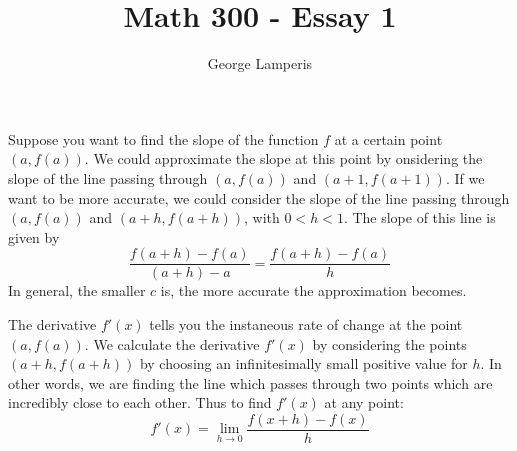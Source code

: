 \documentclass[12pt]{article}
\title{Math 300 - Essay 1}
\author{George Lamperis}
\date{}
\begin{document}
\maketitle

Suppose you want to find the slope of the function $f$ at a certain
point $(a, f(a))$. We could approximate the slope at this point by onsidering
the slope of the line passing through $(a, f(a))$ and $(a+1, f(a+1))$. If we 
want to be more accurate, we could consider the slope of the line passing 
through $(a, f(a))$ and $(a+h, f(a+h))$, with $0 < h < 1$. The slope of this
line is given by 
$$
\frac{f(a+h)-f(a)}{(a+h) - a} = \frac{f(a+h)-f(a)}{h}
$$
In general, the smaller $c$ is, the more accurate the approximation becomes.

The derivative $f'(x)$ tells you the instaneous rate of change at the point 
$(a, f(a))$. We calculate the derivative $f'(x)$ by considering the points 
$(a+h, f(a+h))$ by choosing an infinitesimally small positive value for $h$. In 
other words, we are finding the line which passes through two points which are 
incredibly close to each other. Thus to find $f'(x)$ at any point:
$$
f'(x) = \lim_{h \rightarrow 0} \frac{f(x+h) - f(x)}{h}
$$
\end{document}
